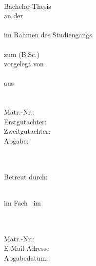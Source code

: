 \documentclass[a4paper, 11pt, german]{article}
\def\True{1}
\begin{document}


\if\parenthesisCite\True
	\let\cite\parencite
\fi

\begin{titlepage}
	\if\BachlorThesis\True
		\begin{center}

			\textbf{\thetitle}\\
			\vspace{2cm}
			Bachelor-Thesis\\
			an der \\
			\Hochschulname\\
			im Rahmen des Studiengangs \\
			\Studiengang \\
			zum \Abschlussbezeinung\space (B.Sc.) \\

			\vspace{0.5cm}
			vorgelegt von \\
			\theauthor \\
			aus\\
			\Addresse\\
			\Email\\

			\vspace{0.5cm}
			Matr.-Nr.: \MatrNummer\\

			\vfill
			Erstgutachter: \Pruefer \\
			Zweitgutachter: \ZweitGutachter \\
			\vspace{0.5cm}
			Abgabe: \thedate
		\end{center}

	\else

		\raggedright
		\Hochschulname \\
		\Studiengang\\
		Betreut durch: \Pruefer

		\vfill
		\begin{center}
			\ArtArbeit\\
			\vspace{1ex}
			im Fach \Modul~im \Semester\\

			\vspace{3.5cm}
			\textbf{\thetitle}

		\end{center}

		\vfill
		\theauthor\\
		\Addresse\\
		Matr.-Nr.: \MatrNummer\\
		\vspace{1ex}
		E-Mail-Adresse \Email\\
		\vspace{3ex}
		Abgabedatum: \thedate

	\fi
\end{titlepage}
\restoregeometry
\end{document}
